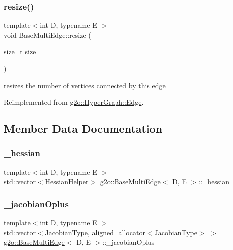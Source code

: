 \subsubsection{\texorpdfstring{resize()}{resize()}}
{\footnotesize\ttfamily template$<$int D, typename E $>$ \\
void Base\+Multi\+Edge\+::resize (\begin{DoxyParamCaption}\item[{size\+\_\+t}]{size }\end{DoxyParamCaption})\hspace{0.3cm}{\ttfamily [virtual]}}

resizes the number of vertices connected by this edge 

Reimplemented from \mbox{\hyperlink{classg2o_1_1_hyper_graph_1_1_edge_ad8913f1149a0fd5bb628f0f1c8a91a55}{g2o\+::\+Hyper\+Graph\+::\+Edge}}.



\subsection{Member Data Documentation}
\mbox{\label{classg2o_1_1_base_multi_edge_af927d6f41bf73fc3b928cae2d6219d9e}} 
\subsubsection{\texorpdfstring{\+\_\+hessian}{\_hessian}}
{\footnotesize\ttfamily template$<$int D, typename E $>$ \\
std\+::vector$<$\mbox{\hyperlink{structg2o_1_1_base_multi_edge_1_1_hessian_helper}{Hessian\+Helper}}$>$ \mbox{\hyperlink{classg2o_1_1_base_multi_edge}{g2o\+::\+Base\+Multi\+Edge}}$<$ D, E $>$\+::\+\_\+hessian\hspace{0.3cm}{\ttfamily [protected]}}

\mbox{\label{classg2o_1_1_base_multi_edge_a00f8130e287bc945a8436375c4d07a02}} 
\subsubsection{\texorpdfstring{\+\_\+jacobian\+Oplus}{\_jacobianOplus}}
{\footnotesize\ttfamily template$<$int D, typename E $>$ \\
std\+::vector$<$\mbox{\hyperlink{classg2o_1_1_base_multi_edge_a43dfdf5b27df296a32ee5a11f0653d55}{Jacobian\+Type}}, aligned\+\_\+allocator$<$\mbox{\hyperlink{classg2o_1_1_base_multi_edge_a43dfdf5b27df296a32ee5a11f0653d55}{Jacobian\+Type}}$>$ $>$ \mbox{\hyperlink{classg2o_1_1_base_multi_edge}{g2o\+::\+Base\+Multi\+Edge}}$<$ D, E $>$\+::\+\_\+jacobian\+Oplus\hspace{0.3cm}{\ttfamily [protected]}}




